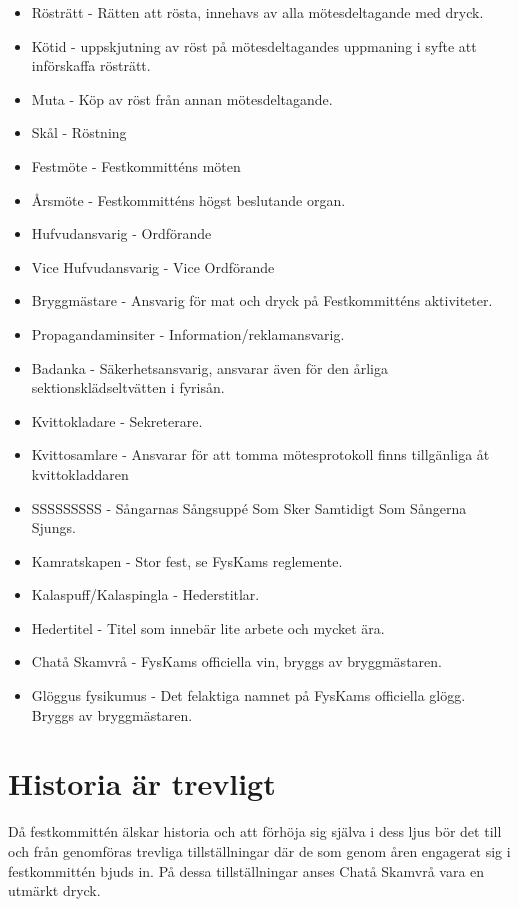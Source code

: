 \documentclass{../resources/dgovdoc}
\begin{document}
\begin{itemize}
\item Rösträtt - Rätten att rösta, innehavs av alla mötesdeltagande med dryck.
\item Kötid - uppskjutning av röst på mötesdeltagandes uppmaning i syfte att    införskaffa rösträtt.
\item Muta -  Köp av röst från annan mötesdeltagande.
\item Skål - Röstning
\item Festmöte - Festkommitténs möten
\item Årsmöte - Festkommitténs högst beslutande organ.
\item Hufvudansvarig - Ordförande
\item Vice Hufvudansvarig - Vice Ordförande
\item Bryggmästare - Ansvarig för mat och dryck på Festkommitténs aktiviteter.
\item Propagandaminsiter - Information/reklamansvarig.
\item Badanka - Säkerhetsansvarig, ansvarar även för den årliga sektionsklädseltvätten i fyrisån.
\item Kvittokladare - Sekreterare.
\item Kvittosamlare - Ansvarar för att tomma mötesprotokoll finns tillgänliga åt kvittokladdaren
\item SSSSSSSSS - Sångarnas Sångsuppé Som Sker Samtidigt Som Sångerna Sjungs.
\item Kamratskapen - Stor fest, se FysKams reglemente.
\item Kalaspuff/Kalaspingla - Hederstitlar.
\item Hedertitel - Titel som innebär lite arbete och mycket ära.
\item Chatå Skamvrå - FysKams officiella vin, bryggs av bryggmästaren.
\item Glöggus fysikumus - Det felaktiga namnet på FysKams officiella glögg. Bryggs av bryggmästaren.
\end{itemize}

\section{Historia är trevligt}

Då festkommittén älskar historia och att förhöja sig själva i dess ljus bör det till och från genomföras trevliga tillställningar där de som genom åren engagerat sig i festkommittén bjuds in.
På dessa tillställningar anses Chatå Skamvrå vara en utmärkt dryck.
\end{document}
